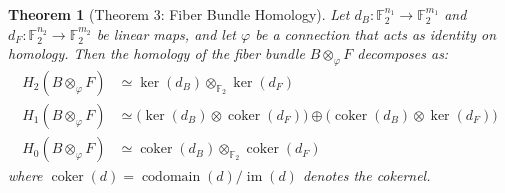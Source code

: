 \documentclass[11pt]{article}
\theoremstyle{plain}
\newtheorem*{theorem}{Theorem}
\theoremstyle{definition}
\theoremstyle{remark}
\renewcommand{\ker}{\operatorname{ker}}
\begin{document}
\begin{theorem}[Theorem 3: Fiber Bundle Homology]
Let $d_B : \mathbb{F}_2^{n_1} \to \mathbb{F}_2^{m_1}$ and $d_F : \mathbb{F}_2^{n_2} \to \mathbb{F}_2^{m_2}$ be linear maps, and let $\varphi$ be a connection that acts as identity on homology. Then the homology of the fiber bundle $B \otimes_\varphi F$ decomposes as:
\begin{align}
H_2(B \otimes_\varphi F) &\simeq \ker(d_B) \otimes_{\mathbb{F}_2} \ker(d_F) \\
H_1(B \otimes_\varphi F) &\simeq \bigl(\ker(d_B) \otimes \operatorname{coker}(d_F)\bigr) \oplus \bigl(\operatorname{coker}(d_B) \otimes \ker(d_F)\bigr) \\
H_0(B \otimes_\varphi F) &\simeq \operatorname{coker}(d_B) \otimes_{\mathbb{F}_2} \operatorname{coker}(d_F)
\end{align}
where $\operatorname{coker}(d) = \operatorname{codomain}(d)/\operatorname{im}(d)$ denotes the cokernel.
\end{theorem}
\end{document}
